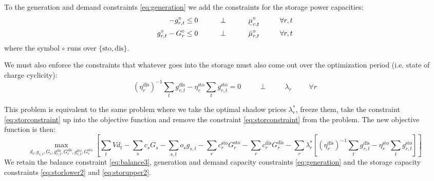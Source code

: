 \documentclass[final,3p,times]{elsarticle}
\begin{document}
To the generation and demand constraints \eqref{eq:generation} we add the
constraints for the storage power capacities:
\begin{align}
  -g^\circ_{r,t}\leq 0 \hspace{1cm}\perp \hspace{1cm} \ubar{\mu}^\circ_{r,t} \hspace{1cm} \forall r,t  \label{eq:storlower2} \\
  g^\circ_{r,t} - G^\circ_r \leq 0 \hspace{1cm}\perp \hspace{1cm} \bar{\mu}^\circ_{r,t} \hspace{1cm} \forall r,t \label{eq:storupper2}
\end{align}
where the symbol $\circ$ runs over $\{\textrm{sto},\textrm{dis}\}$.

We must also enforce the constraints that whatever goes into the storage must
also come out over the optimization period (i.e. state of charge cyclicity):
\begin{equation}
  (\eta_r^{\textrm{dis}})^{-1} \sum_t g^{\textrm{dis}}_{r,t} - \eta_r^{\textrm{sto}}  \sum_t g^{\textrm{sto}}_{r,t}  = 0  \hspace{1cm}\perp \hspace{1cm} \lambda_{r} \hspace{1cm} \forall r \label{eq:storconstraint}
\end{equation}

This problem is equivalent to the same problem where we take the optimal shadow
prices $\lambda^*_r$, freeze them, take the constraint \eqref{eq:storconstraint}
up into the objective function and remove the constraint
\eqref{eq:storconstraint} from the problem. The new objective function is then:
\begin{equation}
  \max_{d_{t}, g_{s,t}, G_s,g^{\textrm{dis}}_{r,t},G^{\textrm{dis}}_{r},g^{\textrm{sto}}_{r,t},G^{\textrm{sto}}_{r}}\left[\sum_{t} Vd_{t} -  \sum_s c_s G_s - \sum_{s,t} o_{s} g_{s,t} -\sum_r c^{\textrm{sto}}_r G^{\textrm{sto}}_r -\sum_r c^{\textrm{dis}}_r G^{\textrm{dis}}_r -\sum_r \lambda^*_r\left[ (\eta_r^{\textrm{dis}})^{-1} \sum_t g^{\textrm{dis}}_{r,t} - \eta_r^{\textrm{sto}}  \sum_t g^{\textrm{sto}}_{r,t}\right]  \right]  \label{eq:objst}
\end{equation}
We retain the balance constraint \eqref{eq:balance3}, generation and demand
capacity constraints \eqref{eq:generation} and the storage capacity constraints
\eqref{eq:storlower2} and \eqref{eq:storupper2}.
\end{document}
